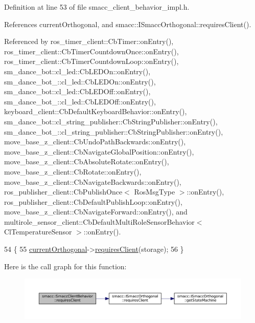 Definition at line 53 of file smacc\+\_\+client\+\_\+behavior\+\_\+impl.\+h.



References current\+Orthogonal, and smacc\+::\+I\+Smacc\+Orthogonal\+::requires\+Client().



Referenced by ros\+\_\+timer\+\_\+client\+::\+Cb\+Timer\+::on\+Entry(), ros\+\_\+timer\+\_\+client\+::\+Cb\+Timer\+Countdown\+Once\+::on\+Entry(), ros\+\_\+timer\+\_\+client\+::\+Cb\+Timer\+Countdown\+Loop\+::on\+Entry(), sm\+\_\+dance\+\_\+bot\+::cl\+\_\+led\+::\+Cb\+L\+E\+D\+On\+::on\+Entry(), sm\+\_\+dance\+\_\+bot\+\_\+::cl\+\_\+led\+::\+Cb\+L\+E\+D\+On\+::on\+Entry(), sm\+\_\+dance\+\_\+bot\+::cl\+\_\+led\+::\+Cb\+L\+E\+D\+Off\+::on\+Entry(), sm\+\_\+dance\+\_\+bot\+\_\+::cl\+\_\+led\+::\+Cb\+L\+E\+D\+Off\+::on\+Entry(), keyboard\+\_\+client\+::\+Cb\+Default\+Keyboard\+Behavior\+::on\+Entry(), sm\+\_\+dance\+\_\+bot\+::cl\+\_\+string\+\_\+publisher\+::\+Cb\+String\+Publisher\+::on\+Entry(), sm\+\_\+dance\+\_\+bot\+\_\+::cl\+\_\+string\+\_\+publisher\+::\+Cb\+String\+Publisher\+::on\+Entry(), move\+\_\+base\+\_\+z\+\_\+client\+::\+Cb\+Undo\+Path\+Backwards\+::on\+Entry(), move\+\_\+base\+\_\+z\+\_\+client\+::\+Cb\+Navigate\+Global\+Position\+::on\+Entry(), move\+\_\+base\+\_\+z\+\_\+client\+::\+Cb\+Absolute\+Rotate\+::on\+Entry(), move\+\_\+base\+\_\+z\+\_\+client\+::\+Cb\+Rotate\+::on\+Entry(), move\+\_\+base\+\_\+z\+\_\+client\+::\+Cb\+Navigate\+Backwards\+::on\+Entry(), ros\+\_\+publisher\+\_\+client\+::\+Cb\+Publish\+Once$<$ Ros\+Msg\+Type $>$\+::on\+Entry(), ros\+\_\+publisher\+\_\+client\+::\+Cb\+Default\+Publish\+Loop\+::on\+Entry(), move\+\_\+base\+\_\+z\+\_\+client\+::\+Cb\+Navigate\+Forward\+::on\+Entry(), and multirole\+\_\+sensor\+\_\+client\+::\+Cb\+Default\+Multi\+Role\+Sensor\+Behavior$<$ Cl\+Temperature\+Sensor $>$\+::on\+Entry().


\begin{DoxyCode}
54 \{
55     \hyperlink{classsmacc_1_1SmaccClientBehavior_a37e6a2fe61c3a72ed2f3e4180f552089}{currentOrthogonal}->\hyperlink{classsmacc_1_1ISmaccOrthogonal_a602e16b09f8a1b3de889f2f3d90a3211}{requiresClient}(storage);
56 \}
\end{DoxyCode}


Here is the call graph for this function\+:
\nopagebreak
\begin{figure}[H]
\begin{center}
\leavevmode
\includegraphics[width=350pt]{classsmacc_1_1SmaccClientBehavior_a917f001e763a1059af337bf4e164f542_cgraph}
\end{center}
\end{figure}




